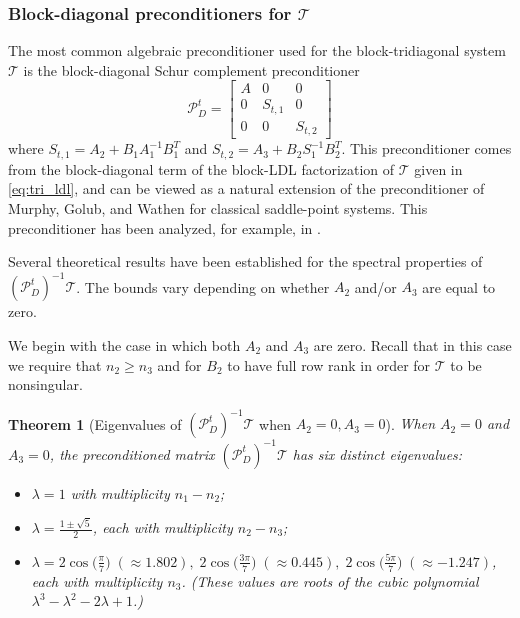 \documentclass{article}
\newtheorem{theorem}{Theorem}
\newcommand{\sT}{\mathcal{T}}
\begin{document}
\subsubsection{Block-diagonal preconditioners for $\sT$}
The most common algebraic preconditioner used for the block-tridiagonal system $\sT$ is the block-diagonal Schur complement preconditioner
\begin{equation}
    \label{eq:pre_blockdi_kt}
    \mathcal{P}_D^t = \begin{bmatrix}
        A & 0 & 0 \\
        0 & S_{t,1} & 0 \\
        0 & 0 & S_{t,2}
    \end{bmatrix}
\end{equation}
where $S_{t,1} = A_2 + B_1A_1^{-1}B_1^T$ and $S_{t,2} = A_3 + B_2 S_1^{-1} B_2^T$. This preconditioner comes from the block-diagonal term of the block-LDL factorization of $\sT$ given in \eqref{eq:tri_ldl}, and can be viewed as a natural extension of the preconditioner of Murphy, Golub, and Wathen \cite{mgw00} for classical saddle-point systems. This preconditioner has been analyzed, for example, in \cite{cmx09,sz18,hm19,bg22,bmpp25}.

Several theoretical results have been established for the spectral properties of \((\mathcal{P}_D^t)^{-1}\sT\). The bounds vary depending on whether $A_2$ and/or $A_3$ are equal to zero.

We begin with the case in which both $A_2$ and $A_3$ are zero. Recall that in this case we require that $n_2 \ge n_3$ and for $B_2$ to have full row rank in order for $\sT$ to be nonsingular.

\begin{theorem}[Eigenvalues of $(\mathcal{P}_D^t)^{-1}\sT$ when $A_2 =0, A_3=0$]
    When $A_2=0$ and $A_3=0$, the preconditioned matrix $(\mathcal{P}_D^t)^{-1}\sT$ has six distinct eigenvalues:
    \begin{itemize}
        \item $\lambda = 1$ with multiplicity $n_1-n_2$;
        \item $\lambda = \frac{1 \pm \sqrt{5}}{2}$, each with multiplicity $n_2-n_3$;
        \item \( \lambda = 2\cos\!\big(\tfrac{\pi}{7}\big)\;(\approx 1.802),\;
2\cos\!\big(\tfrac{3\pi}{7}\big)\;(\approx 0.445),\;
2\cos\!\big(\tfrac{5\pi}{7}\big)\;(\approx -1.247) \), each with multiplicity $n_3$. (These values are roots of the cubic polynomial $\lambda^3 - \lambda^2 -2\lambda +1$.)
    \end{itemize}
\end{theorem}
\end{document}
